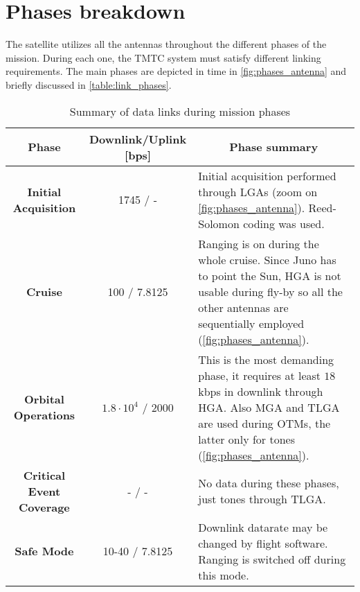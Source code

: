 \section{Phases breakdown}
\label{sec:phases_breakdown}

The satellite utilizes all the antennas throughout the different phases of the mission. During each one, the TMTC system must satisfy different linking requirements. The main phases are depicted in time in \autoref{fig:phases_antenna} and briefly discussed in \autoref{table:link_phases}. 
% 


\begin{table}[H]
    \renewcommand{\arraystretch}{1.7}
    \centering
    \begin{tabularx}{\linewidth}{|c|c|X|}
        \hline
        \textbf{Phase} & \textbf{Downlink/Uplink [bps]} &  \multicolumn{1}{|c|}{\textbf{Phase summary}}  \\
        \hline
        \hline
        \textbf{Initial Acquisition} & 1745 / - & 
        Initial acquisition performed through LGAs \newline (zoom on \autoref{fig:phases_antenna}). Reed-Solomon coding was used. \\ 
        \hline
        \textbf{Cruise} & 100 / 7.8125 & 
        Ranging is on during the whole cruise. Since Juno has to point the Sun, HGA is not usable during fly-by so all the other antennas are sequentially employed (\autoref{fig:phases_antenna}). \\
        \hline
        \textbf{Orbital Operations} & $1.8 \cdot 10^{4} $ / 2000 & 
        This is the most demanding phase, it requires at least $18$ kbps in downlink through HGA. Also MGA and TLGA are used during OTMs, the latter only for tones (\autoref{fig:phases_antenna}). \\
        \hline
        \textbf{Critical Event Coverage} & - / - & No data during these phases, just tones through TLGA.\\
        \hline
        \textbf{Safe Mode} & 10-40 / 7.8125 &
        Downlink datarate may be changed by flight software. Ranging is switched off during this mode. \\
        \hline
    \end{tabularx}
    \caption{Summary of data links during mission phases \cite{juno_telecommunication}}
    \label{table:link_phases}
\end{table}
